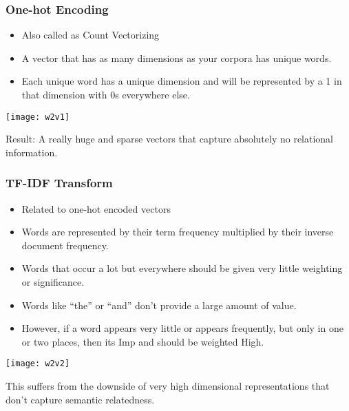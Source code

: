 \begin{frame}[fragile]\frametitle{One-hot Encoding}
  \begin{itemize}
    \item Also called as Count Vectorizing
	\item A vector that has as many dimensions as your corpora has unique words. 
	\item Each unique word has a unique dimension and will be represented by a 1 in that dimension with 0s everywhere else.
  \end{itemize}
  
\begin{center}
\texttt{[image: w2v1]}
\end{center}

Result: A really huge and sparse vectors that capture absolutely no relational information.
\end{frame}

\begin{frame}[fragile]\frametitle{TF-IDF Transform}
  \begin{itemize}
    \item Related to one-hot encoded vectors
	\item Words are represented by their term frequency multiplied by their inverse document frequency.
	\item Words that occur a lot but everywhere should be given very little weighting or significance. 
	\item Words like ``the'' or ``and'' don't provide a large amount of value.
	\item  However, if a word appears very little or appears frequently, but only in one or two places, then its Imp and should be weighted High.
  \end{itemize}
  
\begin{center}
\texttt{[image: w2v2]}
\end{center}

This suffers from the downside of very high dimensional representations that don’t capture semantic relatedness.
\end{frame}

